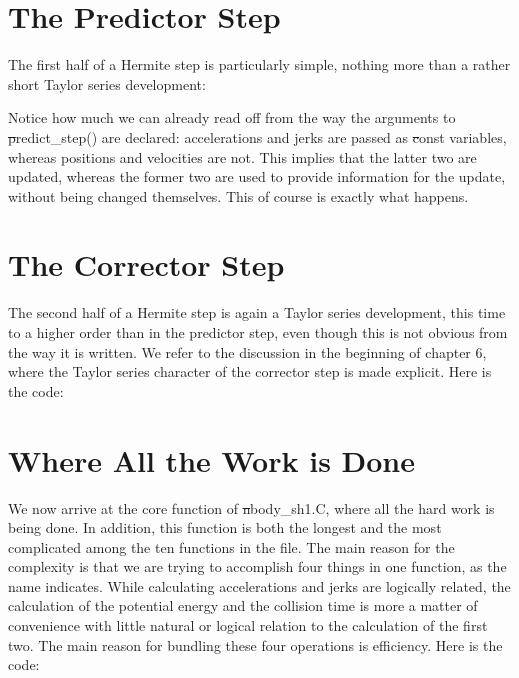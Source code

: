\section{The Predictor Step}

The first half of a Hermite step is particularly simple, nothing more
than a rather short Taylor series development:


Notice how much we can already read off from the way the arguments to 
{\st predict\_step()} are declared: accelerations and jerks are passed
as {\st const} variables, whereas positions and velocities are not.
This implies that the latter two are updated, whereas the former two
are used to provide information for the update, without being changed
themselves.  This of course is exactly what happens.

\section{The Corrector Step}

The second half of a Hermite step is again a Taylor series development,
this time to a higher order than in the predictor step, even though
this is not obvious from the way it is written.  We refer to the
discussion in the beginning of chapter 6, where the Taylor series
character of the corrector step is made explicit.  Here is the code:


\section{Where All the Work is Done}

We now arrive at the core function of {\st nbody\_sh1.C}, where all
the hard work is being done.  In addition, this function is both the
longest and the most complicated among the ten functions in the file.
The main reason for the complexity is that we are trying to accomplish
four things in one function, as the name indicates.  While calculating
accelerations and jerks are logically related, the calculation of the
potential energy and the collision time is more a matter of convenience
with little natural or logical relation to the calculation of the
first two.  The main reason for bundling these four operations is
efficiency.  Here is the code:


